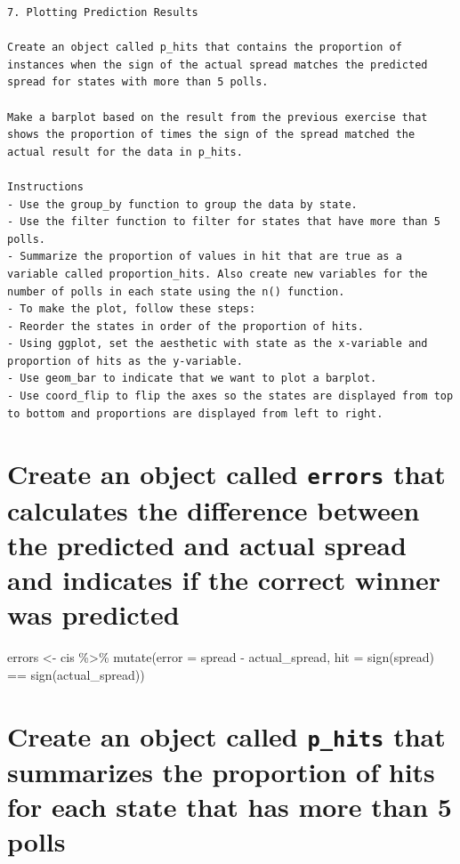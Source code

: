 \documentclass[
]{article}
\begin{document}
\begin{verbatim}
7. Plotting Prediction Results

Create an object called p_hits that contains the proportion of instances when the sign of the actual spread matches the predicted spread for states with more than 5 polls.

Make a barplot based on the result from the previous exercise that shows the proportion of times the sign of the spread matched the actual result for the data in p_hits.

Instructions
- Use the group_by function to group the data by state.
- Use the filter function to filter for states that have more than 5 polls.
- Summarize the proportion of values in hit that are true as a variable called proportion_hits. Also create new variables for the number of polls in each state using the n() function.
- To make the plot, follow these steps:
- Reorder the states in order of the proportion of hits.
- Using ggplot, set the aesthetic with state as the x-variable and proportion of hits as the y-variable.
- Use geom_bar to indicate that we want to plot a barplot.
- Use coord_flip to flip the axes so the states are displayed from top to bottom and proportions are displayed from left to right.
\end{verbatim}

\hypertarget{create-an-object-called-errors-that-calculates-the-difference-between-the-predicted-and-actual-spread-and-indicates-if-the-correct-winner-was-predicted-1}{%
\section{\texorpdfstring{Create an object called \texttt{errors} that
calculates the difference between the predicted and actual spread and
indicates if the correct winner was
predicted}{Create an object called errors that calculates the difference between the predicted and actual spread and indicates if the correct winner was predicted}}\label{create-an-object-called-errors-that-calculates-the-difference-between-the-predicted-and-actual-spread-and-indicates-if-the-correct-winner-was-predicted-1}}

errors \textless- cis \%\textgreater\% mutate(error = spread -
actual\_spread, hit = sign(spread) == sign(actual\_spread))

\hypertarget{create-an-object-called-p_hits-that-summarizes-the-proportion-of-hits-for-each-state-that-has-more-than-5-polls}{%
\section{\texorpdfstring{Create an object called \texttt{p\_hits} that
summarizes the proportion of hits for each state that has more than 5
polls}{Create an object called p\_hits that summarizes the proportion of hits for each state that has more than 5 polls}}\label{create-an-object-called-p_hits-that-summarizes-the-proportion-of-hits-for-each-state-that-has-more-than-5-polls}}
\end{document}
